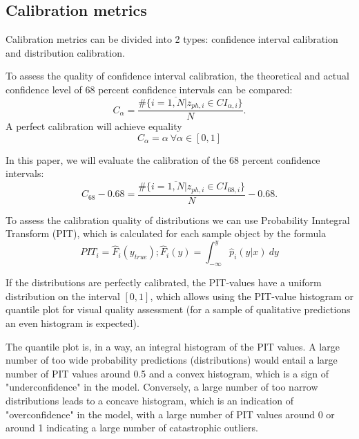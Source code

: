 \documentclass[fleqn,usenatbib]{mnras}
\begin{document}
\subsection{Calibration metrics}\label{sec:calibration-metrics}

Calibration metrics can be divided into 2 types: confidence interval calibration and distribution calibration.

To assess the quality of confidence interval calibration, the theoretical and actual confidence level of 68 percent confidence intervals can be compared:
\begin{equation}\label{eq:calpha}
    C_{\alpha} = \frac{\#\{i = \overline{1, N} | z_{ph,i} \in CI_{\alpha, i}\}}{N}.
\end{equation}
A perfect calibration will achieve equality
\begin{equation}\label{eq:perfect-ci}
    C_{\alpha} = \alpha ~ \forall \alpha \in [0, 1]
\end{equation}

In this paper, we will evaluate the calibration of the 68 percent confidence intervals:
\begin{equation}\label{eq:c68}
    C_{68} - 0.68 = \frac{\#\{i = \overline{1, N} | z_{ph,i} \in CI_{68, i}\}}{N} - 0.68.
\end{equation}

To assess the calibration quality of distributions we can use Probability Inntegral Transform (PIT), which is calculated for each sample object by the formula
\begin{equation}\label{eq:pit}
PIT_i = \hat{F}_i(y_{true}); \hat{F}_i(y) = \int_{-\infty}^{y} \hat{p}_i(y|x) ~ dy
\end{equation}

If the distributions are perfectly calibrated, the PIT-values have a uniform distribution on the interval \([0,1]\), which allows using the PIT-value histogram or quantile plot for visual quality assessment (for a sample of qualitative predictions an even histogram is expected).

The quantile plot is, in a way, an integral histogram of the PIT values. A large number of too wide probability predictions (distributions) would entail a large number of PIT values around 0.5 and a convex histogram, which is a sign of "underconfidence" in the model. Conversely, a large number of too narrow distributions leads to a concave histogram, which is an indication of "overconfidence" in the model, with a large number of PIT values around 0 or around 1 indicating a large number of catastrophic outliers. 
\end{document}
